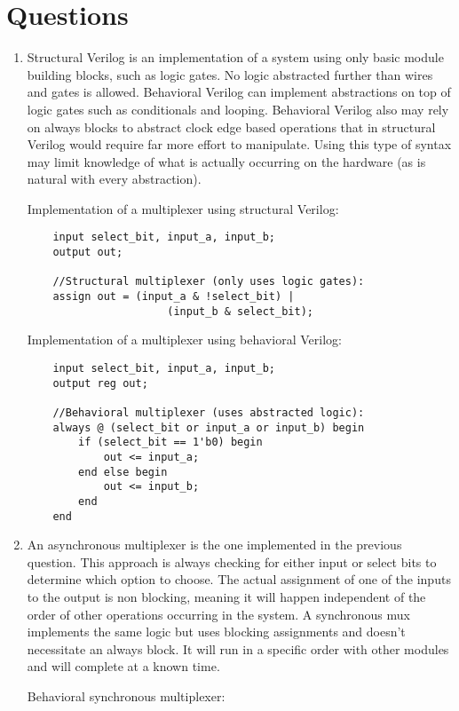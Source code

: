 \documentclass[11pt]{article}
\begin{document}
\section{Questions}
\begin{enumerate}
	\item Structural Verilog is an implementation of a system using only basic module building blocks, such as logic gates. No logic abstracted further than wires and gates is allowed. Behavioral Verilog can implement abstractions on top of logic gates such as conditionals and looping. Behavioral Verilog also may rely on always blocks to abstract clock edge based operations that in structural Verilog would require far more effort to manipulate. Using this type of syntax may limit knowledge of what is actually occurring on the hardware (as is natural with every abstraction).
	
	Implementation of a multiplexer using structural Verilog:
	
	\begin{lstlisting}
	input select_bit, input_a, input_b;
	output out;
	
	//Structural multiplexer (only uses logic gates):
	assign out = (input_a & !select_bit) | 
	                  (input_b & select_bit);
	\end{lstlisting}
	
	Implementation of a multiplexer using behavioral Verilog:
	
	\begin{lstlisting}
	input select_bit, input_a, input_b;
	output reg out;
	
	//Behavioral multiplexer (uses abstracted logic):	
	always @ (select_bit or input_a or input_b)	begin
		if (select_bit == 1'b0) begin
			out <= input_a;
		end else begin
			out <= input_b;
		end
	end
	\end{lstlisting}
	
	\item An asynchronous multiplexer is the one implemented in the previous question. This approach is always checking for either input or select bits to determine which option to choose. The actual assignment of one of the inputs to the output is non blocking, meaning it will happen independent of the order of other operations occurring in the system. A synchronous mux implements the same logic but uses blocking assignments and doesn't necessitate an always block. It will run in a specific order with other modules and will complete at a known time. 
	
	Behavioral synchronous multiplexer:
	

\end{enumerate}
\end{document}

